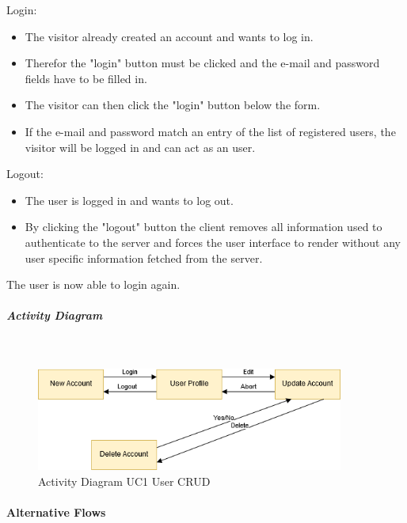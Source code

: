 \noindent
Login:
\begin{itemize}
	\vspace{-3mm}
	\setlength\itemsep{-1em}
	\item The visitor already created an account and wants to log in.
	\item Therefor the "login" button must be clicked and the e-mail and password fields have to be filled in.
	\item The visitor can then click the "login" button below the form.
	\item If the e-mail and password match an entry of the list of registered users, the visitor will be logged in and can act as an user.
\end{itemize}

\noindent
Logout:
\begin{itemize}
	\vspace{-3mm}
	\setlength\itemsep{-1em}
	\item The user is logged in and wants to log out.
	\item By clicking the "logout" button the client removes all information used to authenticate to the server and forces the user interface to render without any user specific information fetched from the server.
\end{itemize}
The user is now able to login again.


\newpage
\subparagraph{Activity Diagram}\mbox{}\\
\begin{figure}[h]
	\centering
	\includegraphics[width=0.9\textwidth]{Content/Domain/UC1UserCRUDactivitydiagram.png}
	\caption{Activity Diagram \ac{UC}1 User CRUD}
	\label{fig:activityDiagramUC1}
\end{figure}

\paragraph*{Alternative Flows}\mbox{}\\

